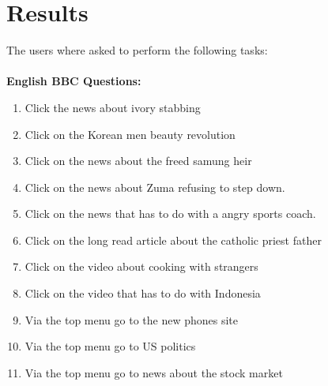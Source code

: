\section{Results}
The users where asked to perform the following tasks:
\\\\
\textbf{English BBC Questions:}
\begin{enumerate}
	\item Click the news about ivory stabbing
	
	\item Click on the Korean men beauty revolution
	
	\item Click on the news about the freed samung heir
	
	\item Click on the news about Zuma refusing to step down.
	
	\item Click on the news that has to do with a angry sports coach.
	
	\item Click on the long read article about the catholic priest father
	
	\item Click on the video about cooking with strangers
	
	\item Click on the video that has to do with Indonesia

	\item Via the top menu go to the new phones site
	
	\item Via the top menu go to US politics
	
	\item Via the top menu go to news about the stock market
	
\end{enumerate}


